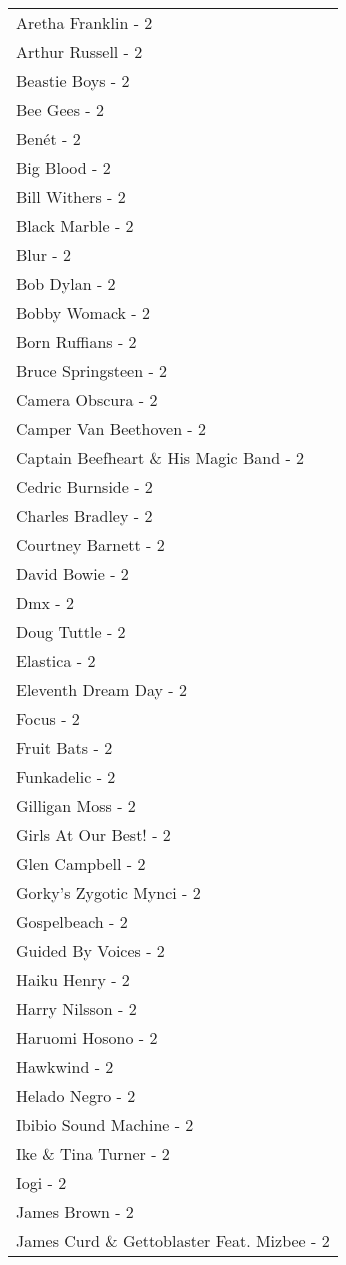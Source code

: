 \documentclass[
]{article}
\begin{document}
\begin{longtable}{l}
Aretha Franklin - 2 \\ 
Arthur Russell - 2 \\ 
Beastie Boys - 2 \\ 
Bee Gees - 2 \\ 
Benét - 2 \\ 
Big Blood - 2 \\ 
Bill Withers - 2 \\ 
Black Marble - 2 \\ 
Blur - 2 \\ 
Bob Dylan - 2 \\ 
Bobby Womack - 2 \\ 
Born Ruffians - 2 \\ 
Bruce Springsteen - 2 \\ 
Camera Obscura - 2 \\ 
Camper Van Beethoven - 2 \\ 
Captain Beefheart \& His Magic Band - 2 \\ 
Cedric Burnside - 2 \\ 
Charles Bradley - 2 \\ 
Courtney Barnett - 2 \\ 
David Bowie - 2 \\ 
Dmx - 2 \\ 
Doug Tuttle - 2 \\ 
Elastica - 2 \\ 
Eleventh Dream Day - 2 \\ 
Focus - 2 \\ 
Fruit Bats - 2 \\ 
Funkadelic - 2 \\ 
Gilligan Moss - 2 \\ 
Girls At Our Best! - 2 \\ 
Glen Campbell - 2 \\ 
Gorky's Zygotic Mynci - 2 \\ 
Gospelbeach - 2 \\ 
Guided By Voices - 2 \\ 
Haiku Henry - 2 \\ 
Harry Nilsson - 2 \\ 
Haruomi Hosono - 2 \\ 
Hawkwind - 2 \\ 
Helado Negro - 2 \\ 
Ibibio Sound Machine - 2 \\ 
Ike \& Tina Turner - 2 \\ 
Iogi - 2 \\ 
James Brown - 2 \\ 
James Curd \& Gettoblaster Feat. Mizbee - 2 \\ 

\end{longtable}
\end{document}
